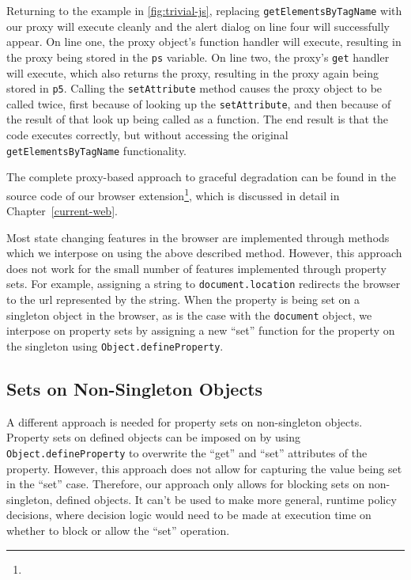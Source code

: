 Returning to the example in \ref{fig:trivial-js}, replacing
\texttt{getElementsByTagName} with our proxy will execute cleanly and the alert
dialog on line four will successfully appear.  On line one, the proxy object's
function handler will execute, resulting in the proxy being stored in the
\texttt{ps} variable.  On line two, the proxy's \texttt{get} handler will
execute, which also returns the proxy, resulting in the proxy again being
stored in \texttt{p5}.  Calling the \texttt{setAttribute} method causes the
proxy object to be called twice, first because of looking up the
\texttt{setAttribute}, and then because of the result of that look up being
called as a function.  The end result is that the code executes correctly, but
without accessing the original \texttt{getElementsByTagName} functionality.

The complete proxy-based approach to graceful degradation can be found in
the source code of our browser extension\footnote{\ExtensionSourceUrl}, which
is discussed in detail in Chapter~\ref{current-web}.

Most state changing features in the browser are implemented through methods
which we interpose on using the above described method.  However, this approach
does not work for the small number of features implemented through property sets.
For example, assigning a string to \texttt{document.location} redirects
the browser to the \gls{url} represented by the string.  When the property is
being set on a singleton object in the browser, as is the case with the
\texttt{document} object, we interpose on property sets by assigning a new
``set'' function for the property on the singleton using
\texttt{Object.defineProperty}.


\subsection{Sets on Non-Singleton Objects}
\label{cost-benefit:intercepting-js:proxy-non-singletons}
A different approach is needed for property sets on non-singleton objects.
Property sets on \WAPI defined objects can be imposed on by using
\texttt{Object.defineProperty} to overwrite the ``get'' and ``set'' attributes
of the property.  However, this approach does not allow for capturing the value
being set in the ``set'' case.  Therefore, our approach only allows for
blocking sets on non-singleton, \WAPI defined objects.  It can't be used to
make more general, runtime policy decisions, where decision logic would need to
be made at execution time on whether to block or allow the ``set'' operation.

